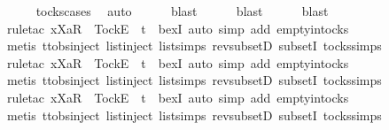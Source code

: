 \begin{isabellebody}
\ \ \ \ \isamarkupfalse%
\ tocks{\isachardot}cases\ \isamarkupfalse%
\ auto\isanewline
\ \ \ \ \isamarkupfalse%
\ blast\isanewline
\ \ \ \ \isamarkupfalse%
\ blast\isanewline
\ \ \ \ \isamarkupfalse%
\ blast\isanewline
\ \ \ \ \isamarkupfalse%
\ {\isacharparenleft}rule{\isacharunderscore}tac\ x{\isacharequal}{\isachardoublequoteopen}{\isacharbrackleft}Xa{\isacharbrackright}\isactrlsub R\ {\isacharhash}\ {\isacharbrackleft}Tock{\isacharbrackright}\isactrlsub E\ {\isacharhash}\ t{\isachardoublequoteclose}\ \ bexI{\isacharcomma}\ auto\ simp\ add{\isacharcolon}\ empty{\isacharunderscore}in{\isacharunderscore}tocks{\isacharparenright}\isanewline
\ \ \ \ \ \ \ \ \ \ \ \isamarkupfalse%
\ {\isacharparenleft}metis\ ttobs{\isachardot}inject{\isacharparenleft}{}{\isacharparenright}\ list{\isachardot}inject\ list{\isachardot}simps{\isacharparenleft}{}{\isacharparenright}\ rev{\isacharunderscore}subsetD\ subsetI\ tocks{\isachardot}simps{\isacharparenright}\isanewline
\ \ \ \ \isamarkupfalse%
\ {\isacharparenleft}rule{\isacharunderscore}tac\ x{\isacharequal}{\isachardoublequoteopen}{\isacharbrackleft}Xa{\isacharbrackright}\isactrlsub R\ {\isacharhash}\ {\isacharbrackleft}Tock{\isacharbrackright}\isactrlsub E\ {\isacharhash}\ t{\isachardoublequoteclose}\ \ bexI{\isacharcomma}\ auto\ simp\ add{\isacharcolon}\ empty{\isacharunderscore}in{\isacharunderscore}tocks{\isacharparenright}\isanewline
\ \ \ \ \isamarkupfalse%
\ {\isacharparenleft}metis\ ttobs{\isachardot}inject{\isacharparenleft}{}{\isacharparenright}\ list{\isachardot}inject\ list{\isachardot}simps{\isacharparenleft}{}{\isacharparenright}\ rev{\isacharunderscore}subsetD\ subsetI\ tocks{\isachardot}simps{\isacharparenright}\isanewline
\ \ \ \ \isamarkupfalse%
\ {\isacharparenleft}rule{\isacharunderscore}tac\ x{\isacharequal}{\isachardoublequoteopen}{\isacharbrackleft}Xa{\isacharbrackright}\isactrlsub R\ {\isacharhash}\ {\isacharbrackleft}Tock{\isacharbrackright}\isactrlsub E\ {\isacharhash}\ t{\isachardoublequoteclose}\ \ bexI{\isacharcomma}\ auto\ simp\ add{\isacharcolon}\ empty{\isacharunderscore}in{\isacharunderscore}tocks{\isacharparenright}\isanewline
\ \ \ \ \isamarkupfalse%
\ {\isacharparenleft}metis\ ttobs{\isachardot}inject{\isacharparenleft}{}{\isacharparenright}\ list{\isachardot}inject\ list{\isachardot}simps{\isacharparenleft}{}{\isacharparenright}\ rev{\isacharunderscore}subsetD\ subsetI\ tocks{\isachardot}simps{\isacharparenright}\isanewline

\end{isabellebody}

